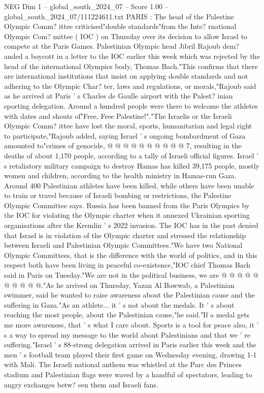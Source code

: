 \begin{textsample}{NEG Dim 1 – global\_south\_2024\_07 – Score 1.00 – global\_south\_2024\_07/111224611.txt}  \label{ex:f1_neg_391}
PARIS : The head of the Palestine Olympic Comm? ittee criticised"double standards"from the Inte? rnational Olympic Com? mittee ( IOC ) on Thursday over its decision to allow Israel to compete at the Paris Games.
Palestinian Olympic head Jibril Rajoub dem? anded a boycott in a letter to the IOC earlier this week which was rejected by the head of the international Olympics body, Thomas Bach."This confirms that there are international institutions that insist on applying double standards and not adhering to the Olympic Char? ter, laws and regulations, or morals,"Rajoub said as he arrived at Paris ' s Charles de Gaulle airport with the Palest? inian sporting delegation.
Around a hundred people were there to welcome the athletes with dates and shouts of"Free, Free Palestine!"."The Israelis or the Israeli Olympic Comm? ittee have lost the moral, sports, humanitarian and legal right to participate,"Rajoub added, saying Israel ' s ongoing bombardment of Gaza amounted to"crimes of genocide, @ @ @ @ @ @ @ @ @ @ 7, resulting in the deaths of about 1,170 people, according to a tally of Israeli official figures.
Israel ' s retaliatory military campaign to destroy Hamas has killed 39,175 people, mostly women and children, according to the health ministry in Hamas-run Gaza.
Around 400 Palestinian athletes have been killed, while others have been unable to train or travel because of Israeli bombing or restrictions, the Palestine Olympic Committee says.
Russia has been banned from the Paris Olympics by the IOC for violating the Olympic charter when it annexed Ukrainian sporting organisations after the Kremlin ' s 2022 invasion.
The IOC has in the past denied that Israel is in violation of the Olympic charter and stressed the relationship between Israeli and Palestinian Olympic Committees."We have two National Olympic Committees, that is the difference with the world of politics, and in this respect both have been living in peaceful co-existence,"IOC chief Thomas Bach said in Paris on Tuesday."We are not in the political business, we are @ @ @ @ @ @ @ @ @ @."As he arrived on Thursday, Yazan Al Bawwab, a Palestinian swimmer, said he wanted to raise awareness about the Palestinian cause and the suffering in Gaza."As an athlete... it ' s not about the medals.
It ' s about reaching the most people, about the Palestinian cause,"he said."If a medal gets me more awareness, that ' s what I care about.
Sports is a tool for peace also, it ' s a way to spread my message to the world about Palestinians and that we ' re suffering."Israel ' s 88-strong delegation arrived in Paris earlier this week and the men ' s football team played their first game on Wednesday evening, drawing 1-1 with Mali.
The Israeli national anthem was whistled at the Parc des Princes stadium and Palestinian flags were waved by a handful of spectators, leading to angry exchanges betw? een them and Israeli fans.

\end{textsample}
